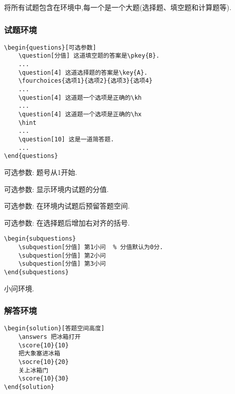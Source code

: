 \documentclass[list,answers,csize4,custom]{sysuexam}
\begin{document}
将所有试题包含在环境中,每一个是一个大题(选择题、填空题和计算题等).

\subsubsection{试题环境}
\begin{verbatim}
\begin{questions}[可选参数]
    \question[分值] 这道填空题的答案是\pkey{B}.
    ...
    \question[4] 这道选择题的答案是\key{A}.
    \fourchoices{选项1}{选项2}{选项3}{选项4}
    ...
    \question[4] 这道题一个选项是正确的\kh
    ...
    \question[4] 这道题一个选项是正确的\hx
    \hint
    ...
    \question[10] 这是一道简答题.
    ...
\end{questions}
\end{verbatim}

可选参数: 题号从1开始.

可选参数: 显示环境内试题的分值.

可选参数: 在环境内试题后预留答题空间.

可选参数: 在选择题后增加右对齐的括号.

\begin{verbatim}
\begin{subquestions}
    \subquestion[分值] 第1小问  % 分值默认为0分.
    \subquestion[分值] 第2小问
    \subquestion[分值] 第3小问
\end{subquestions}
\end{verbatim}

小问环境.


\subsubsection{解答环境}
\begin{verbatim}
\begin{solution}[答题空间高度]
    \answers 把冰箱打开
    \score{10}{10}
    把大象塞进冰箱
    \socre{10}{20}
    关上冰箱门
    \score{10}{30}
\end{solution}
\end{verbatim}
\end{document}
